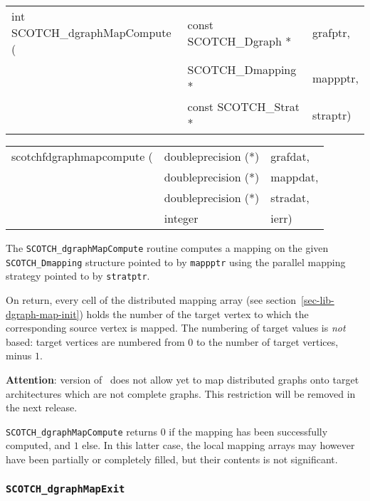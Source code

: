 \begin{itemize}
\progsyn

{\tt\begin{tabular}{l@{}ll}
int SCOTCH\_dgraphMapCompute ( & const SCOTCH\_Dgraph * & grafptr, \\
                               & SCOTCH\_Dmapping *     & mappptr, \\
                               & const SCOTCH\_Strat *  & straptr)
\end{tabular}}

{\tt\begin{tabular}{l@{}ll}
scotchfdgraphmapcompute ( & doubleprecision (*) & grafdat, \\
                          & doubleprecision (*) & mappdat, \\
                          & doubleprecision (*) & stradat, \\
                          & integer             & ierr)
\end{tabular}}

\progdes

The {\tt SCOTCH\_dgraphMapCompute} routine computes a mapping
on the given {\tt SCOTCH\_\lbt Dmapping} structure pointed
to by {\tt mappptr} using the parallel mapping strategy pointed to
by {\tt stratptr}.

On return, every cell of the distributed mapping array (see
section~\ref{sec-lib-dgraph-map-init}) holds the number of the target
vertex to which the corresponding source vertex is mapped. The
numbering of target values is {\em not\/} based: target vertices are
numbered from $0$ to the number of target vertices, minus $1$.

{\bf Attention}: version {} of \scotch\ does not allow yet to
map distributed graphs onto target architectures which are not
complete graphs. This restriction will be removed in the next release.

\progret

{\tt SCOTCH\_dgraphMapCompute} returns $0$ if the mapping has been
successfully computed, and $1$ else. In this latter case, the local
mapping arrays may however have been partially or completely filled,
but their contents is not significant.
\end{itemize}

\subsubsection{{\tt SCOTCH\_dgraphMapExit}}

